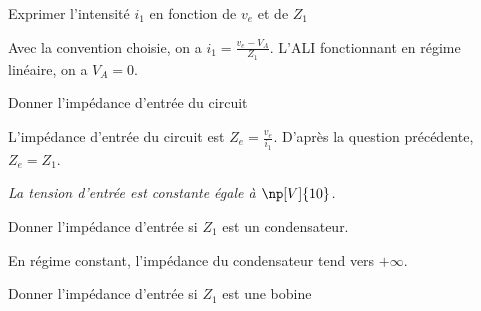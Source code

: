 \begin{enonce}
  Exprimer l’intensité \(i_{1}\) en fonction de \(v_{e}\) et de \(Z_{1}\)
\end{enonce}


\begin{corrige}
  Avec la convention choisie, on a \(i_{1} = \frac{v_{e} - V_{A}}{Z_{1}}\).  L’ALI fonctionnant en régime linéaire, on a \(V_{A} = 0\).
\end{corrige}




\begin{enonce}
  Donner l’impédance d’entrée du circuit
\end{enonce}


\begin{corrige}
  L’impédance d’entrée du circuit est \(Z_{e} = \frac{v_{e}}{i_{1}}\). D’après la question précédente, \(Z_{e} = Z_{1}\).
\end{corrige}


\medskip
{\itshape La tension d’entrée est constante égale à \(\np[V]{10}\).}
\minusBigskip



\begin{enonce}
  Donner l’impédance d’entrée si \(Z_{1}\) est un condensateur.
\end{enonce}

\reponse{\(\infty\)}

\begin{corrige}
  En régime constant, l’impédance du condensateur tend vers \(+\infty\).
\end{corrige}




\begin{enonce}
  Donner l’impédance d’entrée si \(Z_{1}\) est une bobine
\end{enonce}

